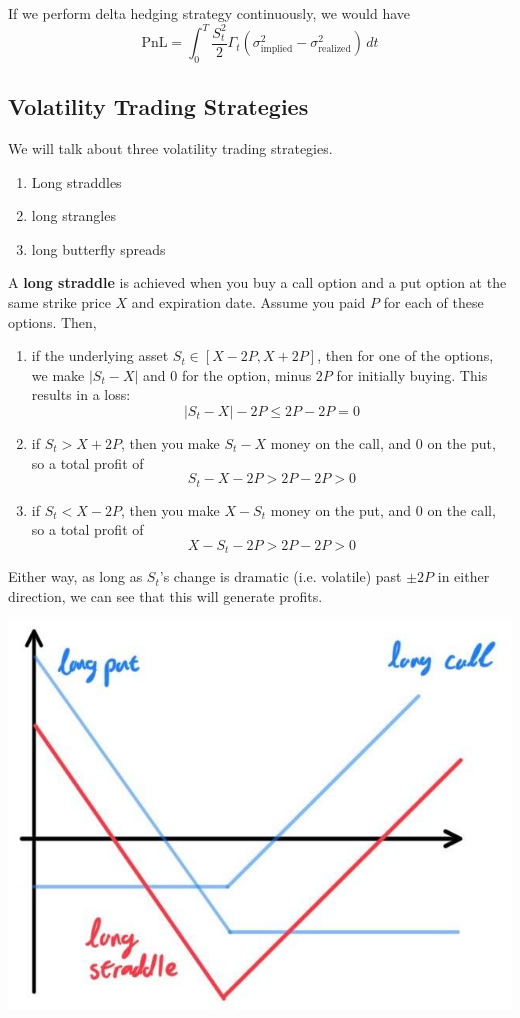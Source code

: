 \documentclass{article}
\begin{document}
If we perform delta hedging strategy continuously, we would have 
\[\text{PnL} = \int_0^T \frac{S_t^2}{2} \Gamma_t (\sigma_{\text{implied}}^2 - \sigma_{\text{realized}}^2 )\, dt\]

\subsection{Volatility Trading Strategies}
We will talk about three volatility trading strategies. 
\begin{enumerate}
    \item Long straddles 
    \item long strangles 
    \item long butterfly spreads
\end{enumerate}

\begin{definition}
A \textbf{long straddle} is achieved when you buy a call option and a put option at the same strike price $X$ and expiration date. Assume you paid $P$ for each of these options. Then, 
\begin{enumerate}
    \item if the underlying asset $S_t \in [X - 2P, X + 2P]$, then for one of the options, we make $|S_t - X|$ and $0$ for the option, minus $2P$ for initially buying. This results in a loss: 
    \[|S_t - X| - 2P \leq 2P - 2P = 0 \]
    \item if $S_t > X + 2P$, then you make $S_t - X$ money on the call, and $0$ on the put, so a total profit of 
    \[S_t - X - 2P > 2P - 2P > 0\]
    
    \item if $S_t < X - 2P$, then you make $X - S_t$ money on the put, and $0$ on the call, so a total profit of 
    \[X - S_t - 2P > 2P - 2P > 0\]
\end{enumerate}
Either way, as long as $S_t$'s change is dramatic (i.e. volatile) past $\pm 2P$ in either direction, we can see that this will generate profits. 
\begin{center}
    \includegraphics[scale=0.3]{img/long_straddle.jpg}
\end{center}
\end{definition}
\end{document}
